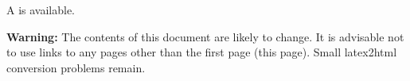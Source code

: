 \newcommand\plottwo[2]{{%
 \typeout{Plottwo included the files #1 #2}
 \centering
 \leavevmode
 \columnwidth=.45\columnwidth
 \texttt{[image: \#1]}%
 \hfil
 \texttt{[image: \#2]}%
}}%




\setlength{\parindent}{0pt}
\setlength{\parskip}{2.5mm}

\maketitle

\begin{htmlonly}
A 
is available. 

{\bf Warning:} The contents of this document are likely to change.
It is advisable not to use links to any pages other than the first
page (this page). Small latex2html conversion problems remain.
\end{htmlonly}

%
%
%


\pagestyle{empty}

\newpage

\pagestyle{headings}
\tableofcontents
{}
\listoftables
{}
\listoffigures
{}

